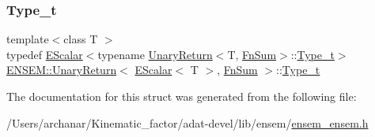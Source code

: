 \mbox{\label{structENSEM_1_1UnaryReturn_3_01EScalar_3_01T_01_4_00_01FnSum_01_4_af4e59c889efbb46ce21a3b03bb7c9b9e}} 
\subsubsection{\texorpdfstring{Type\_t}{Type\_t}\hspace{0.1cm}{\footnotesize\ttfamily [3/3]}}
{\footnotesize\ttfamily template$<$class T $>$ \\
typedef \mbox{\hyperlink{classENSEM_1_1EScalar}{E\+Scalar}}$<$typename \mbox{\hyperlink{structENSEM_1_1UnaryReturn}{Unary\+Return}}$<$T, \mbox{\hyperlink{structENSEM_1_1FnSum}{Fn\+Sum}}$>$\+::\mbox{\hyperlink{structENSEM_1_1UnaryReturn_3_01EScalar_3_01T_01_4_00_01FnSum_01_4_af4e59c889efbb46ce21a3b03bb7c9b9e}{Type\+\_\+t}}$>$ \mbox{\hyperlink{structENSEM_1_1UnaryReturn}{E\+N\+S\+E\+M\+::\+Unary\+Return}}$<$ \mbox{\hyperlink{classENSEM_1_1EScalar}{E\+Scalar}}$<$ T $>$, \mbox{\hyperlink{structENSEM_1_1FnSum}{Fn\+Sum}} $>$\+::\mbox{\hyperlink{structENSEM_1_1UnaryReturn_3_01EScalar_3_01T_01_4_00_01FnSum_01_4_af4e59c889efbb46ce21a3b03bb7c9b9e}{Type\+\_\+t}}}



The documentation for this struct was generated from the following file\+:\begin{DoxyCompactItemize}
\item 
/\+Users/archanar/\+Kinematic\+\_\+factor/adat-\/devel/lib/ensem/\mbox{\hyperlink{adat-devel_2lib_2ensem_2ensem__ensem_8h}{ensem\+\_\+ensem.\+h}}\end{DoxyCompactItemize}
